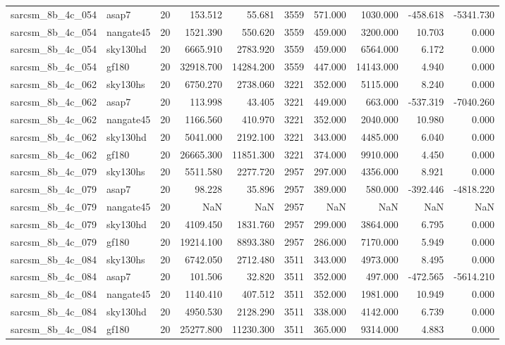 \documentclass{article}
\begin{document}
\begin{longtable}{llrrrrrrrr}
sarcsm\_8b\_4c\_054 & asap7 & 20 & 153.512 & 55.681 & 3559 & 571.000 & 1030.000 & -458.618 & -5341.730 \\
sarcsm\_8b\_4c\_054 & nangate45 & 20 & 1521.390 & 550.620 & 3559 & 459.000 & 3200.000 & 10.703 & 0.000 \\
sarcsm\_8b\_4c\_054 & sky130hd & 20 & 6665.910 & 2783.920 & 3559 & 459.000 & 6564.000 & 6.172 & 0.000 \\
sarcsm\_8b\_4c\_054 & gf180 & 20 & 32918.700 & 14284.200 & 3559 & 447.000 & 14143.000 & 4.940 & 0.000 \\
sarcsm\_8b\_4c\_062 & sky130hs & 20 & 6750.270 & 2738.060 & 3221 & 352.000 & 5115.000 & 8.240 & 0.000 \\
sarcsm\_8b\_4c\_062 & asap7 & 20 & 113.998 & 43.405 & 3221 & 449.000 & 663.000 & -537.319 & -7040.260 \\
sarcsm\_8b\_4c\_062 & nangate45 & 20 & 1166.560 & 410.970 & 3221 & 352.000 & 2040.000 & 10.980 & 0.000 \\
sarcsm\_8b\_4c\_062 & sky130hd & 20 & 5041.000 & 2192.100 & 3221 & 343.000 & 4485.000 & 6.040 & 0.000 \\
sarcsm\_8b\_4c\_062 & gf180 & 20 & 26665.300 & 11851.300 & 3221 & 374.000 & 9910.000 & 4.450 & 0.000 \\
sarcsm\_8b\_4c\_079 & sky130hs & 20 & 5511.580 & 2277.720 & 2957 & 297.000 & 4356.000 & 8.921 & 0.000 \\
sarcsm\_8b\_4c\_079 & asap7 & 20 & 98.228 & 35.896 & 2957 & 389.000 & 580.000 & -392.446 & -4818.220 \\
sarcsm\_8b\_4c\_079 & nangate45 & 20 & NaN & NaN & 2957 & NaN & NaN & NaN & NaN \\
sarcsm\_8b\_4c\_079 & sky130hd & 20 & 4109.450 & 1831.760 & 2957 & 299.000 & 3864.000 & 6.795 & 0.000 \\
sarcsm\_8b\_4c\_079 & gf180 & 20 & 19214.100 & 8893.380 & 2957 & 286.000 & 7170.000 & 5.949 & 0.000 \\
sarcsm\_8b\_4c\_084 & sky130hs & 20 & 6742.050 & 2712.480 & 3511 & 343.000 & 4973.000 & 8.495 & 0.000 \\
sarcsm\_8b\_4c\_084 & asap7 & 20 & 101.506 & 32.820 & 3511 & 352.000 & 497.000 & -472.565 & -5614.210 \\
sarcsm\_8b\_4c\_084 & nangate45 & 20 & 1140.410 & 407.512 & 3511 & 352.000 & 1981.000 & 10.949 & 0.000 \\
sarcsm\_8b\_4c\_084 & sky130hd & 20 & 4950.530 & 2128.290 & 3511 & 338.000 & 4142.000 & 6.739 & 0.000 \\
sarcsm\_8b\_4c\_084 & gf180 & 20 & 25277.800 & 11230.300 & 3511 & 365.000 & 9314.000 & 4.883 & 0.000 \\

\end{longtable}
\end{document}
